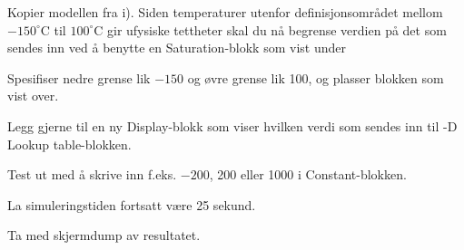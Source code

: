 

\item[j)]
  Kopier modellen fra i). Siden temperaturer utenfor
  definisjonsområdet mellom  $-150^{\circ}$C til $100^{\circ}$C gir
  ufysiske tettheter skal du nå begrense verdien på det som
  sendes inn ved å benytte
  en {\sf  Saturation}-blokk som vist under
  \begin{figure}[H]
    \centering
    \hspace*{0mm}
  \end{figure}
 Spesifiser nedre grense
  lik $-150$ og øvre grense lik 100, og  plasser blokken
  som vist over.

  Legg gjerne til en ny {\sf  Display}-blokk som viser hvilken verdi
  som sendes inn til {-D Lookup table}-blokken. 
  
  Test ut med å skrive inn f.eks. $-200$, 200 eller 1000 i {\sf Constant}-blokken.

  {\color{red}La simuleringstiden fortsatt være  25 sekund.}

Ta med skjermdump av
resultatet.
